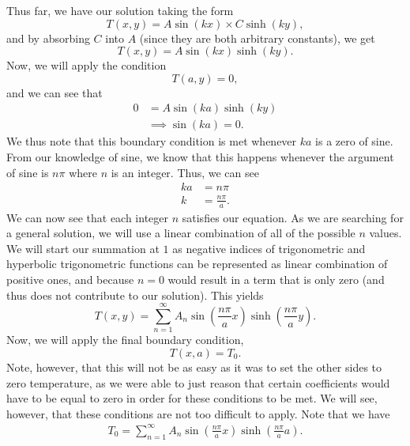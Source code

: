 \documentclass[11pt]{report}
\newcommand{\fpar}[1]{\left({#1}\right)}
\begin{document}
Thus far, we have our solution taking the form
     \[T(x,y) = A\sin\fpar{kx}\times C\sinh\fpar{ky},\]
and by absorbing $C$ into $A$ (since they are both arbitrary constants), we get
    \[T(x,y) = A\sin\fpar{kx}\sinh\fpar{ky}.\]
Now, we will apply the condition
    \[T(a,y)=0,\]
and we can see that
    \begin{align*}
        0 &= A\sin\fpar{ka}\sinh\fpar{ky}\\
        &\implies \sin\fpar{k a} = 0 .
    \end{align*}
We thus note that this boundary condition is met whenever $ka$ is a zero of sine. From our knowledge of sine, we know that this happens whenever the argument of sine is $n\pi$ where $n$ is an integer. Thus, we can see
    \begin{align*}
        ka &= n\pi\\
        k &= \frac{n\pi}{a}.
    \end{align*}
We can now see that each integer $n$ satisfies our equation. As we are searching for a general solution, we will use a linear combination of all of the possible $n$ values. We will start our summation at $1$ as negative indices of trigonometric and hyperbolic trigonometric functions can be represented as linear combination of positive ones, and because $n=0$ would result in a term that is only zero (and thus does not contribute to our solution). 
This yields
    \[T(x,y) = \sum_{n=1}^\infty A_n\sin\fpar{\frac{n\pi}{a}x}\sinh\fpar{\frac{n\pi}{a}y}.\]
Now, we will apply the final boundary condition,
    \[T(x,a) = T_0. \]
Note, however, that this will not be as easy as it was to set the other sides to zero temperature, as we were able to just reason that certain coefficients would have to be equal to zero in order for these conditions to be met. We will see, however, that these conditions are not too difficult to apply. 
Note that we have
    \begin{align*}
        T_0 = \sum_{n=1}^\infty A_n\sin\fpar{\frac{n\pi}{a}x}\sinh\fpar{\frac{n\pi}{a}a}.
    \end{align*}
\end{document}

